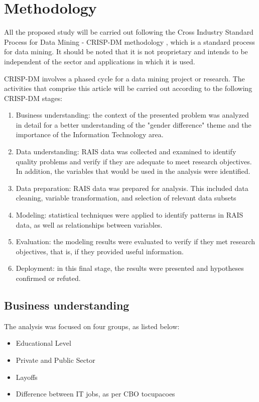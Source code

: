 \section{Methodology}

All the proposed study will be carried out following the Cross Industry Standard Process for Data Mining - CRISP-DM methodology \cite{chapman2000crisp}, which is a standard process for data mining. It should be noted that it is not proprietary and intends to be independent of the sector and applications in which it is used.

CRISP-DM involves a phased cycle for a data mining project or research. The activities that comprise this article will be carried out according to the following CRISP-DM stages:

\begin{enumerate}
	\item Business understanding: the context of the presented problem was analyzed in detail for a better understanding of the "gender difference" theme and the importance of the Information Technology area.
	\item Data understanding: RAIS data was collected and examined to identify quality problems and verify if they are adequate to meet research objectives. In addition, the variables that would be used in the analysis were identified.
	\item Data preparation: RAIS data was prepared for analysis. This included data cleaning, variable transformation, and selection of relevant data subsets
	\item Modeling: statistical techniques were applied to identify patterns in RAIS data, as well as relationships between variables.
	\item Evaluation: the modeling results were evaluated to verify if they met research objectives, that is, if they provided useful information.
	\item Deployment: in this final stage, the results were presented and hypotheses confirmed or refuted.
\end{enumerate}
	      	      	      
\subsection{Business understanding}
	      	      	    
The analysis was focused on four groups, as listed below:

\begin{itemize}
	\item Educational Level	      	      	      	      
	\item Private and Public Sector	      	     
	\item Layoffs
	\item Difference between IT jobs, as per CBO t{ocupacoes}    	      	      	     
\end{itemize}
	      	      	    
